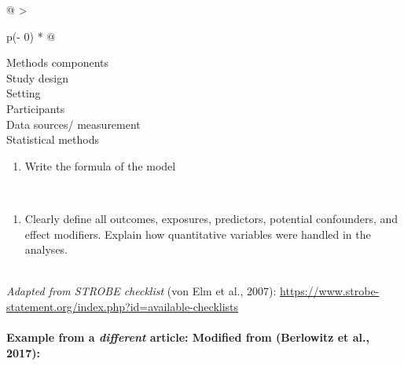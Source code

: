 \documentclass[
  openany]{book}
\providecommand{\tightlist}{%
  \setlength{\itemsep}{0pt}\setlength{\parskip}{0pt}}
\begin{document}
\begin{longtable}[]{@{}
  >{\raggedright\arraybackslash}p{(\columnwidth - 0\tabcolsep) * }@{}}
\toprule
Methods components \\
\midrule
\endhead
Study design \\
Setting \\
Participants \\
Data sources/ measurement \\
Statistical methods \\
\begin{minipage}[t]{\linewidth}\raggedright
\begin{enumerate}
\def\labelenumi{(\alph{enumi})}
\setcounter{enumi}{1}
\tightlist
\item
  Write the formula of the model
\end{enumerate}
\end{minipage} \\
\begin{minipage}[t]{\linewidth}\raggedright
\begin{enumerate}
\def\labelenumi{(\alph{enumi})}
\setcounter{enumi}{2}
\tightlist
\item
  Clearly define all outcomes, exposures, predictors, potential confounders, and effect modifiers. Explain how quantitative variables were handled in the analyses.
\end{enumerate}
\end{minipage} \\
\emph{Adapted from STROBE checklist} (von Elm et al., 2007): \url{https://www.strobe-statement.org/index.php?id=available-checklists} \\
\bottomrule
\end{longtable}

\hypertarget{example-from-a-different-article-modified-from-berlowitz-et-al.-2017}{%
\paragraph{\texorpdfstring{Example from a \emph{different} article: Modified from (Berlowitz et al., 2017):}{Example from a different article: Modified from (Berlowitz et al., 2017):}}\label{example-from-a-different-article-modified-from-berlowitz-et-al.-2017}}
\end{document}
